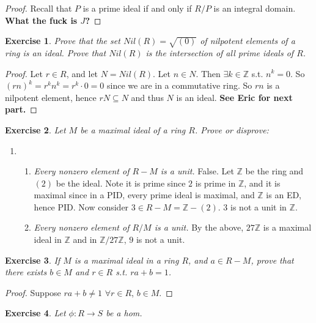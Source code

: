 \documentclass[10pt,oneside,reqno]{amsart}
\theoremstyle{plain}
\newtheorem{e}{Exercise}
\theoremstyle{definition}
\newcommand{\sub}{\subseteq}
\newcommand{\fa}{\forall}
\newcommand{\z}{\mathbb{Z}}
\newcommand{\n}{\mathbb{Z}}
\begin{document}
\begin{proof}
Recall that $P$ is a prime ideal if and only if $R/P$ is an integral domain. \textbf{What the fuck is $J$?}
\end{proof}

\begin{e}
Prove that the set $Nil(R) = \sqrt{(0)}$ of nilpotent elements of a ring is an ideal. Prove that $Nil(R)$ is the intersection of all prime ideals of $R$. 
\end{e}

\begin{proof}
Let $r \in R$, and let $N = Nil(R)$. Let $n \in N$. Then $\exists k \in \n$ s.t. $n^k = 0$. So $(rn)^k = r^kn^k = r^k \cdot 0 = 0$ since we are in a commutative ring. So $rn$ is a nilpotent element, hence $rN \sub N$ and thus $N$ is an ideal. \textbf{See Eric for next part. }
\end{proof}

\begin{e}
Let $M$ be a maximal ideal of a ring $R$. Prove or disprove: 
\end{e}

\begin{enumerate}
\item[]
\begin{enumerate}
\item \textit{Every nonzero element of $R-M$ is a unit. }
False. Let $\z$ be the ring and $(2)$ be the ideal. Note it is prime since $2$ is prime in $\z$, and it is maximal since in a PID, every prime ideal is maximal, and $\z$ is an ED, hence PID. Now consider $3 \in R - M = \z - (2)$. $3$ is not a unit in $\z$. 
\item \textit{Every nonzero element of $R/M$ is a unit. }
By the above, $27\z$ is a maximal ideal in $\z$ and in $\z/27\z$, $9$ is not a unit. 
\end{enumerate}
\end{enumerate}

\begin{e}
If $M$ is a maximal ideal in a ring $R$, and $a \in R - M$, prove that there exists $b \in M$ and $r \in R$ s.t. $ra + b = 1$. 
\end{e}

\begin{proof}
Suppose $ra + b \neq 1$ $\fa r \in R$, $b \in M$. 
\end{proof}

\begin{e}
Let $\phi:R \to S$ be a hom. 
\end{e}
\end{document}

